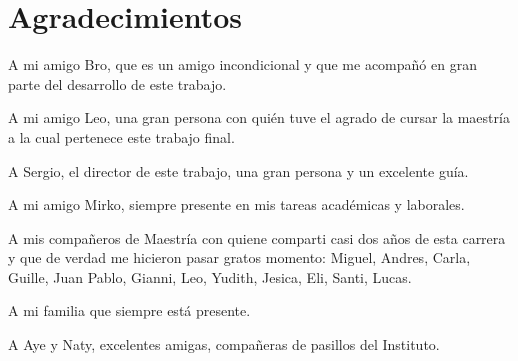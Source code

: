 \chapter*{Agradecimientos}
\label{chap:agradecimientos}

A mi amigo Bro, que es un amigo incondicional y que me acompañó en gran parte del desarrollo de este trabajo.

A mi amigo Leo, una gran persona con quién tuve el agrado de cursar la maestría a la cual pertenece este trabajo final.

A Sergio, el director de este trabajo, una gran persona y un excelente guía.

A mi amigo Mirko, siempre presente en mis tareas académicas y laborales.

A mis compañeros de Maestría con quiene comparti casi dos años de esta carrera y que de verdad me hicieron pasar gratos momento: Miguel, Andres, Carla, Guille, Juan Pablo, Gianni, Leo, Yudith, Jesica, Eli, Santi, Lucas.

A mi familia que siempre está presente.

A Aye y Naty, excelentes amigas, compañeras de pasillos del Instituto.
